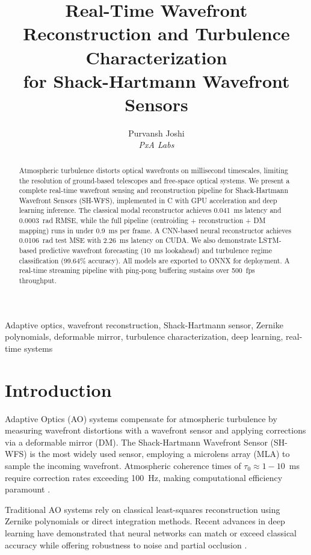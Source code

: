 \documentclass[twocolumn,10pt]{IEEEtran}
\title{Real-Time Wavefront Reconstruction and Turbulence Characterization \\for Shack-Hartmann Wavefront Sensors}
\author{
    Purvansh Joshi\\
    \textit{PxA Labs}
}
\begin{document}
\maketitle

\begin{abstract}
Atmospheric turbulence distorts optical wavefronts on millisecond timescales, limiting the resolution of ground-based telescopes and free-space optical systems. We present a complete real-time wavefront sensing and reconstruction pipeline for Shack-Hartmann Wavefront Sensors (SH-WFS), implemented in C with GPU acceleration and deep learning inference. The classical modal reconstructor achieves 0.041~ms latency and 0.0003~rad RMSE, while the full pipeline (centroiding + reconstruction + DM mapping) runs in under 0.9~ms per frame. A CNN-based neural reconstructor achieves 0.0106~rad test MSE with 2.26~ms latency on CUDA. We also demonstrate LSTM-based predictive wavefront forecasting (10~ms lookahead) and turbulence regime classification (99.64\% accuracy). All models are exported to ONNX for deployment. A real-time streaming pipeline with ping-pong buffering sustains over 500~fps throughput.
\end{abstract}

\begin{IEEEkeywords}
Adaptive optics, wavefront reconstruction, Shack-Hartmann sensor, Zernike polynomials, deformable mirror, turbulence characterization, deep learning, real-time systems
\end{IEEEkeywords}

\section{Introduction}
\label{sec:intro}

Adaptive Optics (AO) systems compensate for atmospheric turbulence by measuring wavefront distortions with a wavefront sensor and applying corrections via a deformable mirror (DM). The Shack-Hartmann Wavefront Sensor (SH-WFS) is the most widely used sensor, employing a microlens array (MLA) to sample the incoming wavefront. Atmospheric coherence times of $\tau_0 \approx 1\!-\!10$~ms require correction rates exceeding 100~Hz, making computational efficiency paramount \cite{rodrier}.

Traditional AO systems rely on classical least-squares reconstruction using Zernike polynomials or direct integration methods. Recent advances in deep learning have demonstrated that neural networks can match or exceed classical accuracy while offering robustness to noise and partial occlusion \cite{andersen2020deep, swanson2018neural}.
\end{document}
